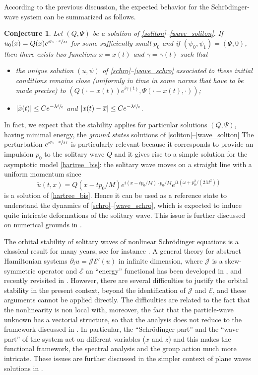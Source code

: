 \documentclass[11pt]{article}
\let\oldbar\bar\let\oldhat\hat\let\oldtilde\tilde
\let\bar\oldbar
\let\hat\oldhat
\let\tilde\oldtilde
\DeclareRobustCommand{\accentset}[2]{\overset{#1}{#2}}
\newtheorem{conj}[lemma]{Conjecture}
\theoremstyle{definition}
\newcommand*{\overbigdot}[1]{%
\accentset{\mbox{\large\bfseries .}}{#1}}
\let\bar\overline
\let\hat\widehat
\let\tilde\widetilde
\begin{document}
According to the previous discussion, the expected behavior for the Schrödinger-wave system can be summarized as follows.
\begin{conj}
Let $(Q,\Psi)$ be a solution of \eqref{soliton}--\eqref{wave_soliton}.
If $u_{0}(x)=Q(x)e^{i\sfrac{p_{0}\cdot x}{M}}$ for some sufficiently small $p_{0}$ and if $(\psi_{0},\psi_{1})=(\Psi,0)$, then there exists two functions $x=x(t)$ and $\gamma=\gamma(t)$ such that
\begin{itemize}
\item the unique solution $(u,\psi)$ of \eqref{schro}--\eqref{wave_schro} associated to these initial conditions remains close (uniformly in time in some norms that have to be made precise) to $(Q(\cdot-x(t))e^{i\gamma(t)},\Psi(\cdot-x(t),\cdot))$;
\item $|\overbigdot{x}(t)|\leq C e^{-\lambda\sfrac{t}{c}}$ and $|x(t)-\bar{x}|\leq C e^{-\lambda\sfrac{t}{c}}$.
\end{itemize}
\end{conj}

In fact, we expect that the stability applies for particular solutions $(Q,\Psi)$, having minimal energy, the \emph{ground states} solutions of \eqref{soliton}--\eqref{wave_soliton}
The perturbation $e^{i\sfrac{p_{0}\cdot x}{M}}$ is particularly relevant because
it corresponds to provide an impulsion $p_0$ to the solitary wave
$Q$ and it gives rise
to a simple solution for the asymptotic model \eqref{hartree_bis}:
the solitary wave moves on a straight
line with a uniform momentum
since
\[
\tilde u(t,x)=Q(x-tp_0/M)e^{i(x-tp_0/M)\cdot p_0/M}e^{it(\omega +p_0^2/(2M^2))}
\]
is a solution of \eqref{hartree_bis}.
Hence it can be used as a reference state to understand the dynamics of
\eqref{schro}--\eqref{wave_schro}, which is expected to induce
quite intricate deformations of the solitary wave. This issue is further discussed
on numerical grounds in \cite{LVNum1}.

The orbital stability of solitary waves of nonlinear Schrödinger equations is a classical result for many years, see for instance \cite{Cazenave_Lions_orbital_stab,Weinstein1,Weinstein2}.
A general theory for abstract Hamiltonian systems $\partial_t u=\mathscr J \mathscr E'(u)$
in infinite dimension, where $\mathscr J$ is a skew-symmetric operator and $\mathscr E$ an ``energy'' functional
has been developed in \cite{GSS,GSS2}, and recently revisited in \cite{SRN1}.
However, there are several difficulties to justify the orbital stability in the present context, beyond the identification of $\mathscr J$ and $\mathscr E$, and these arguments cannot be applied directly.
The difficulties are
related to the fact that the nonlinearity is non local with, moreover,
the fact that the particle-wave unknown has a vectorial structure, so that the analysis does not reduce to the framework discussed in \cite{GSS,GSS2}.
In particular,
the ``Schrödinger part'' and the ``wave part'' of the system act on different variables ($x$ and $z$)
and this makes the functional framework, the spectral analysis and the group action much more intricate.
These issues are further discussed in the simpler context of plane waves solutions in \cite{GRN}.
\end{document}
